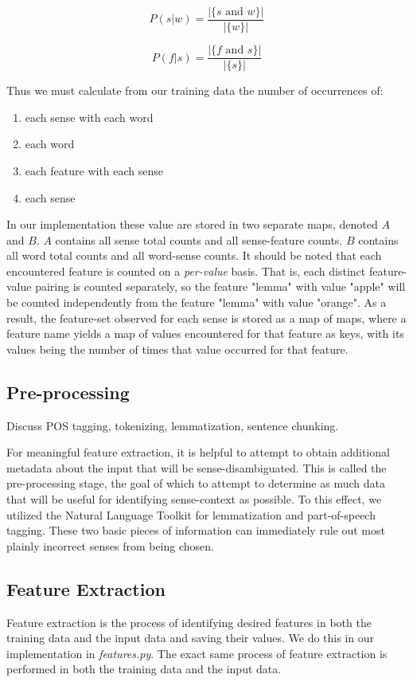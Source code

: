 \documentclass[11pt]{article}
\begin{document}
$$P(s|w) = \frac{|\{s \text{ and } w\}|}{|\{w\}|}$$

$$P(f|s) = \frac{|\{f \text{ and } s\}|}{|\{s\}|}$$

Thus we must calculate from our training data the number of occurrences of:

\begin{enumerate}
\itemsep 0em
\item each sense with each word
\item each word
\item each feature with each sense
\item each sense
\end{enumerate}

In our implementation these value are stored in two separate maps, denoted $A$ and $B$. $A$ contains all sense total counts and all sense-feature counts. $B$ contains all word total counts and all word-sense counts. It should be noted that each encountered feature is counted on a \emph{per-value} basis. That is, each distinct feature-value pairing is counted separately, so the feature "lemma" with value "apple" will be counted independently from the feature "lemma" with value "orange". As a result, the feature-set observed for each sense is stored as a map of maps, where a feature name yields a map of values encountered for that feature as keys, with its values being the number of times that value occurred for that feature.

\subsection{Pre-processing}
Discuss POS tagging, tokenizing, lemmatization, sentence chunking.

For meaningful feature extraction, it is helpful to attempt to obtain additional metadata about the input that will be sense-disambiguated. This is called the pre-processing stage, the goal of which to attempt to determine as much data that will be useful for identifying sense-context as possible. To this effect, we utilized the Natural Language Toolkit for lemmatization and part-of-speech tagging. These two basic pieces of information can immediately rule out most plainly incorrect senses from being chosen.

\subsection{Feature Extraction}
Feature extraction is the process of identifying desired features in both the training data and the input data and saving their values. We do this in our implementation in \emph{features.py}. The exact same process of feature extraction is performed in both the training data and the input data.
\end{document}
